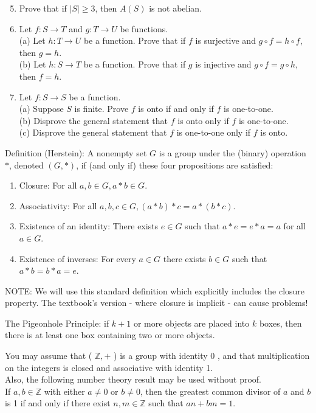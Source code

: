 \begin{enumerate}
  \setcounter{enumi}{4}
  \item Prove that if $|S| \geq 3$, then $A(S)$ is not abelian.
  \item Let $f: S \rightarrow T$ and $g: T \rightarrow U$ be functions.\\
(a) Let $h: T \rightarrow U$ be a function. Prove that if $f$ is surjective and $g \circ f=h \circ f$, then $g=h$.\\
(b) Let $h: S \rightarrow T$ be a function. Prove that if $g$ is injective and $g \circ f=g \circ h$, then $f=h$.
  \item Let $f: S \rightarrow S$ be a function.\\
(a) Suppose $S$ is finite. Prove $f$ is onto if and only if $f$ is one-to-one.\\
(b) Disprove the general statement that $f$ is onto only if $f$ is one-to-one.\\
(c) Disprove the general statement that $f$ is one-to-one only if $f$ is onto.
\end{enumerate}

Definition (Herstein): A nonempty set $G$ is a group under the (binary) operation $*$, denoted $(G, *)$, if (and only if) these four propositions are satisfied:

\begin{enumerate}
  \item Closure: For all $a, b \in G, a * b \in G$.
  \item Associativity: For all $a, b, c \in G,(a * b) * c=a *(b * c)$.
  \item Existence of an identity: There exists $e \in G$ such that $a * e=e * a=a$ for all $a \in G$.
  \item Existence of inverses: For every $a \in G$ there exists $b \in G$ such that $a * b=b * a=e$.
\end{enumerate}

NOTE: We will use this standard definition which explicitly includes the closure property. The textbook's version - where closure is implicit - can cause problems!

The Pigeonhole Principle: if $k+1$ or more objects are placed into $k$ boxes, then there is at least one box containing two or more objects.







\newpage

You may assume that ( $\mathbb{Z},+$ ) is a group with identity 0 , and that multiplication on the integers is closed and associative with identity 1.\\
Also, the following number theory result may be used without proof.\\
If $a, b \in \mathbb{Z}$ with either $a \neq 0$ or $b \neq 0$, then the greatest common divisor of $a$ and $b$ is 1 if and only if there exist $n, m \in \mathbb{Z}$ such that $a n+b m=1$.

